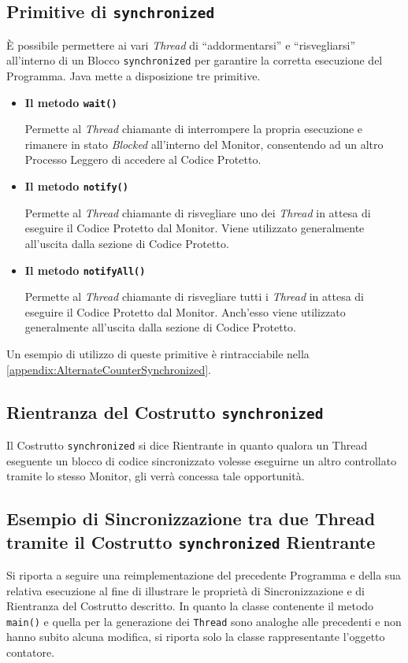 \subsection{Primitive di \texttt{synchronized}}
È possibile permettere ai vari \textit{Thread} di ``addormentarsi'' e ``risvegliarsi'' all'interno di un Blocco \texttt{synchronized} per garantire la corretta esecuzione del Programma. Java mette a disposizione tre primitive.\
\begin{itemize}
    \item \textbf{Il metodo \texttt{wait()}} \par
    Permette al \textit{Thread} chiamante di interrompere la propria esecuzione e rimanere in stato \textit{Blocked} all'interno del Monitor, consentendo ad un altro Processo Leggero di accedere al Codice Protetto.
    \item \textbf{Il metodo \texttt{notify()}} \par
    Permette al \textit{Thread} chiamante di risvegliare uno dei \textit{Thread} in attesa di eseguire il Codice Protetto dal Monitor. Viene utilizzato generalmente all'uscita dalla sezione di Codice Protetto.
    \item \textbf{Il metodo \texttt{notifyAll()}} \par
    Permette al \textit{Thread} chiamante di risvegliare tutti i \textit{Thread} in attesa di eseguire il Codice Protetto dal Monitor. Anch'esso viene utilizzato generalmente all'uscita dalla sezione di Codice Protetto.
\end{itemize}
Un esempio di utilizzo di queste primitive è rintracciabile nella \autoref{appendix:AlternateCounterSynchronized}.
\subsection{Rientranza del Costrutto \texttt{synchronized}}
Il Costrutto \texttt{synchronized} si dice Rientrante in quanto qualora un Thread eseguente un blocco di codice sincronizzato volesse eseguirne un altro controllato tramite lo stesso Monitor, gli verrà concessa tale opportunità.
\subsection{Esempio di Sincronizzazione tra due Thread tramite il Costrutto \texttt{synchronized} Rientrante}
Si riporta a seguire una reimplementazione del precedente Programma e della sua relativa esecuzione al fine di illustrare le proprietà di Sincronizzazione e di Rientranza del Costrutto descritto. In quanto la classe contenente il metodo \texttt{main()} e quella per la generazione dei \texttt{Thread} sono analoghe alle precedenti e non hanno subito alcuna modifica, si riporta solo la classe rappresentante l'oggetto contatore.

